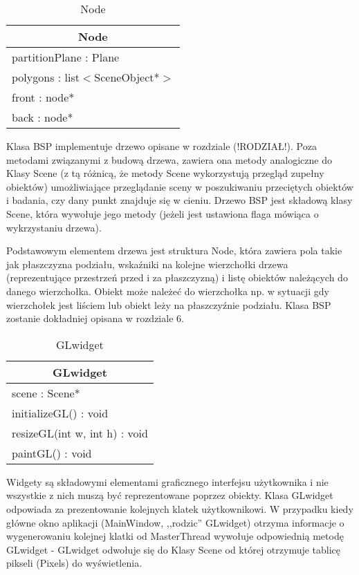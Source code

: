 \begin{longtable}{|p{16cm}|}
    \caption{Node} \label{tab:Node} \\ \hline
    \multicolumn{1}{|c|}{Node} \\ \hline
    partitionPlane : Plane \\
    polygons : list$<$SceneObject*$>$ \\
    front : node*  \\
    back : node*  \\ \hline
\end{longtable}

Klasa BSP implementuje drzewo opisane w rozdziale (!RODZIAŁ!). Poza metodami związanymi z budową drzewa, zawiera ona metody analogiczne do Klasy Scene (z tą różnicą, że metody Scene wykorzystują przegląd zupełny obiektów) umożliwiające przeglądanie sceny w poszukiwaniu przeciętych obiektów i badania, czy dany punkt znajduje się w cieniu. Drzewo BSP jest składową klasy Scene, która wywołuje jego metody (jeżeli jest ustawiona flaga mówiąca o wykrzystaniu drzewa).

Podstawowym elementem drzewa jest struktura Node, która zawiera pola takie jak płaszczyzna podziału, wskaźniki na kolejne wierzchołki drzewa (reprezentujące przestrzeń przed i za płaszczyzną) i listę obiektów należących do danego wierzchołka. Obiekt może należeć do wierzchołka np. w sytuacji gdy wierzchołek jest liściem lub obiekt leży na płaszczyźnie podziału. Klasa BSP zostanie dokładniej opisana w rozdziale 6.

\begin{longtable}{|p{16cm}|}
    \caption{GLwidget} \label{tab:GLwidget} \\ \hline
    \multicolumn{1}{|c|}{GLwidget} \\ \hline
    scene : Scene*  \\ \hline
    initializeGL() : void \\ 
    resizeGL(int w, int h) : void \\
    paintGL() : void \\ \hline
\end{longtable}

Widgety są składowymi elementami graficznego interfejsu użytkownika i nie wszystkie z nich muszą być reprezentowane poprzez obiekty. Klasa GLwidget odpowiada za prezentowanie kolejnych klatek użytkownikowi. W przypadku kiedy główne okno aplikacji (MainWindow, ,,rodzic'' GLwidget) otrzyma informacje o wygenerowaniu kolejnej klatki od MasterThread wywołuje odpowiednią metodę GLwidget - GLwidget odwołuje się do Klasy Scene od której otrzymuje tablicę pikseli (Pixels) do wyświetlenia. 

